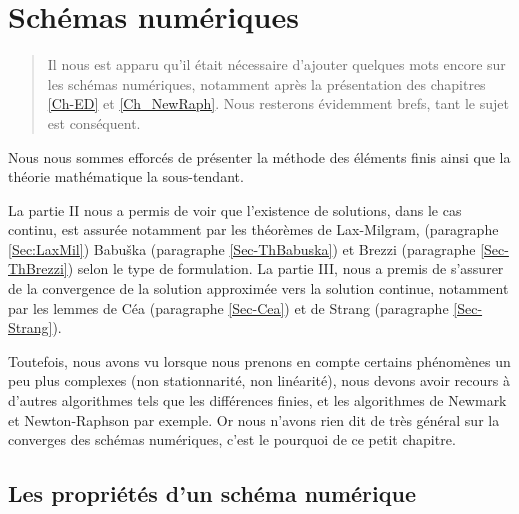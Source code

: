 \chapter{Schémas numériques}\label{Ch-shemanum}
\begin{abstract}
Il nous est apparu qu'il était nécessaire d'ajouter quelques mots encore sur les schémas numériques,
notamment après la présentation des chapitres \ref{Ch-ED} et \ref{Ch_NewRaph}. Nous resterons
évidemment brefs, tant le sujet est conséquent.
\end{abstract}


\medskip
Nous nous sommes efforcés de présenter la méthode des éléments finis ainsi que la théorie mathématique la 
sous-tendant.

La partie II nous a permis de voir que l'existence de solutions, dans le cas continu, est assurée notamment par 
les théorèmes de Lax-Milgram,
(paragraphe \ref{Sec:LaxMil}) Babuška (paragraphe \ref{Sec-ThBabuska}) et 
Brezzi\label{Sec:Brezzi} (paragraphe \ref{Sec-ThBrezzi}) selon le type de formulation. 
La partie III, nous a premis de s'assurer de la convergence de la solution approximée vers la solution continue, notamment par les 
lemmes de Céa (paragraphe \ref{Sec-Cea}) et de 
Strang (paragraphe \ref{Sec-Strang}).

Toutefois, nous avons vu lorsque nous prenons en compte certains phénomènes un peu plus complexes (non stationnarité, non linéarité), 
nous devons avoir recours à d'autres algorithmes tels que les différences finies, et les algorithmes de Newmark et Newton-Raphson par 
exemple. Or nous n'avons rien dit de très général sur la converges des schémas numériques, c'est le pourquoi de ce petit chapitre.


\medskip
\section{Les propriétés d'un schéma numérique}


\medskip
